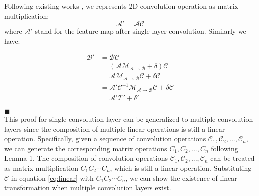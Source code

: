 \documentclass[titlepage]{article}
\newcommand*{\QEDA}{\hfill\ensuremath{\blacksquare}}
\begin{document}
\noindent
Following existing works \cite{Dumoulin2016AGT}, we represents 2D convolution operation as matrix multiplication:
\begin{equation}
    \mathcal{A'} = \mathcal{A}\mathcal{C}
\end{equation}
where $\mathcal{A'}$ stand for the feature map after single layer convolution. Similarly we have:

\begin{equation} \label{eq:linear}
    \begin{aligned} 
        \mathcal{B'}    &= \mathcal{B}\mathcal{C} \\
                        &= (\mathcal{A}\mathcal{M}_{\mathcal{A} \to \mathcal{B}} + \mathcal{\delta} )\mathcal{C} \\
                        &= \mathcal{A}\mathcal{M}_{\mathcal{A} \to \mathcal{B}}\mathcal{C} + \mathcal{\delta}\mathcal{C}\\
                        &= \mathcal{A'}{\mathcal{C}}^{-1}\mathcal{M}_{\mathcal{A} \to \mathcal{B}}\mathcal{C} + \mathcal{\delta}\mathcal{C} \\
                        &= \mathcal{A'}\mathcal{T'} + \mathcal{\delta'}
    \end{aligned}
\end{equation}


\QEDA\\

 This proof for single convolution layer can be generalized to multiple convolution layers since the composition of multiple linear operations is still a linear operation.
Specifically, given a sequence of convolution operations $\mathcal{C}_1, \mathcal{C}_2, ..., \mathcal{C}_n$, we can generate the corresponding matrix operations $C_1, C_2, ..., C_n$ following  Lemma 1.
The composition of convolution operations $\mathcal{C}_1, \mathcal{C}_2, ..., \mathcal{C}_n$ can be treated as matrix multiplication $C_1 C_2 \cdots C_n$, which is still a linear operation.
Substituting $\mathcal{C}$ in equation \ref{eq:linear} with $C_1 C_2 \cdots C_n$, we can show the existence of linear transformation when multiple convolution layers exist.\\
\end{document}
